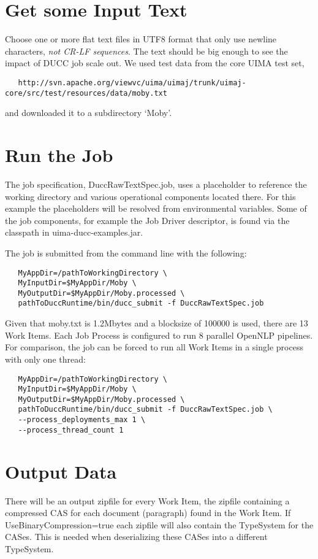 \section{Get some Input Text}
Choose one or more flat text files in UTF8 format that only use newline characters,
{\em not CR-LF sequences}.
The text should be big enough to see the impact of DUCC job scale out.
We used test data from the core UIMA test set,
\begin{verbatim}
   http://svn.apache.org/viewvc/uima/uimaj/trunk/uimaj-core/src/test/resources/data/moby.txt
\end{verbatim}
and downloaded it to a subdirectory `Moby'.

\section{Run the Job}
The job specification, DuccRawTextSpec.job, uses a placeholder to reference the working directory
and various operational components located there. For this example the placeholders will be resolved
from environmental variables. Some of the job components, for example
the Job Driver descriptor, is found via the classpath in uima-ducc-examples.jar.

The job is submitted from the command line with the following:
\begin{verbatim}
   MyAppDir=/pathToWorkingDirectory \
   MyInputDir=$MyAppDir/Moby \
   MyOutputDir=$MyAppDir/Moby.processed \
   pathToDuccRuntime/bin/ducc_submit -f DuccRawTextSpec.job
\end{verbatim}

Given that moby.txt is 1.2Mbytes and a blocksize of 100000 is used, there are 13 Work Items. Each Job Process is configured to run 8 parallel OpenNLP pipelines. For comparison, the job can be forced to run all Work Items in a single process with only one thread:
\begin{verbatim}
   MyAppDir=/pathToWorkingDirectory \
   MyInputDir=$MyAppDir/Moby \
   MyOutputDir=$MyAppDir/Moby.processed \
   pathToDuccRuntime/bin/ducc_submit -f DuccRawTextSpec.job \
   --process_deployments_max 1 \
   --process_thread_count 1
\end{verbatim}

\section{Output Data}
There will be an output zipfile for every Work Item, the zipfile containing a compressed CAS for each document (paragraph) 
found in the Work Item. If UseBinaryCompression=true each zipfile will also contain the TypeSystem for the CASes. 
This is needed when deserializing these CASes into a different TypeSystem.


